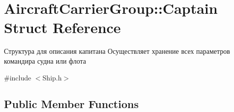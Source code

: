 \hypertarget{struct_aircraft_carrier_group_1_1_captain}{}\section{Aircraft\+Carrier\+Group\+:\+:Captain Struct Reference}
\label{struct_aircraft_carrier_group_1_1_captain}


Структура для описания капитана  Осуществляет хранение всех параметров командира судна или флота  




{\ttfamily \#include $<$Ship.\+h$>$}

\subsection*{Public Member Functions}
